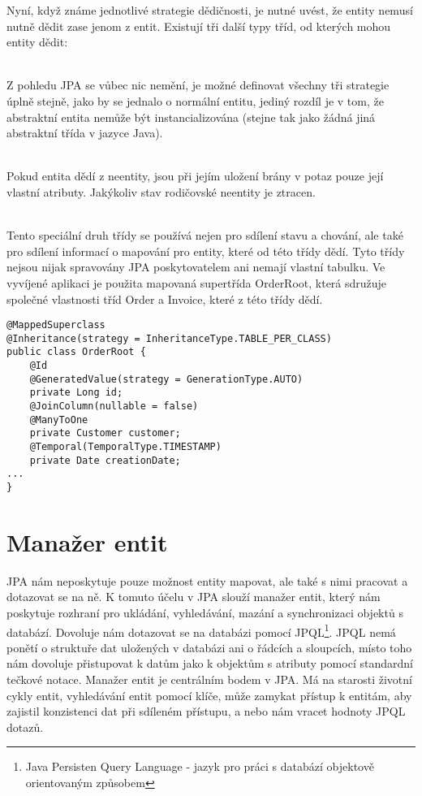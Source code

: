 \documentclass[122pt,oneside]{fithesis}
\begin{document}
Nyní, když známe jednotlivé strategie dědičnosti, je nutné uvést, že entity nemusí nutně dědit zase jenom z entit. Existují tři další typy tříd, od kterých mohou entity dědit:

\vspace{5 mm}
\\\indent Z pohledu JPA se vůbec nic nemění, je možné definovat všechny tři strategie úplně stejně, jako by se jednalo o normální entitu, jediný rozdíl je v tom, že abstraktní entita nemůže být instancializována (stejne tak jako žádná jiná abstraktní třída v jazyce Java).

\vspace{5 mm}
\\\indent Pokud entita dědí z neentity, jsou při jejím uložení brány v potaz pouze její vlastní atributy. Jakýkoliv stav rodičovské neentity je ztracen.

\vspace{5 mm}
\\\indent Tento speciální druh třídy se používá nejen pro sdílení stavu a chování, ale také pro sdílení informací o mapování pro entity, které od této třídy dědí. Tyto třídy nejsou nijak spravovány JPA poskytovatelem ani nemají vlastní tabulku. Ve vyvíjené aplikaci je použita mapovaná supertřída OrderRoot, která sdružuje společné vlastnosti tříd Order a Invoice, které z této třídy dědí.

\begin{lstlisting}
@MappedSuperclass
@Inheritance(strategy = InheritanceType.TABLE_PER_CLASS)
public class OrderRoot {
	@Id
	@GeneratedValue(strategy = GenerationType.AUTO)
	private Long id;
	@JoinColumn(nullable = false)
	@ManyToOne
	private Customer customer;
	@Temporal(TemporalType.TIMESTAMP)
	private Date creationDate;
...
}
\end{lstlisting}

\section{Manažer entit}

JPA nám neposkytuje pouze možnost entity mapovat, ale také s nimi pracovat a dotazovat se na ně. K tomuto účelu v JPA slouží manažer entit, který nám poskytuje rozhraní pro ukládání, vyhledávání, mazání a synchronizaci objektů s databází. Dovoluje nám dotazovat se na databázi pomocí JPQL\footnote[1]{Java Persisten Query Language - jazyk pro práci s databází objektově orientovaným způsobem}. JPQL nemá ponětí o struktuře dat uložených v databázi ani o řádcích a sloupcích, místo toho nám dovoluje přistupovat k datům jako k objektům s atributy pomocí standardní tečkové notace. Manažer entit je centrálním bodem v JPA. Má na starosti životní cykly entit, vyhledávání entit pomocí klíče, může zamykat přístup k entitám, aby zajistil konzistenci dat při sdíleném přístupu, a nebo nám vracet hodnoty JPQL dotazů.
\end{document}
